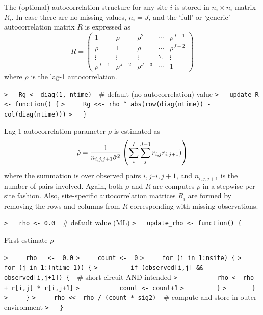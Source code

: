 \documentclass[a4paper]{article}
\begin{document}
The (optional) autocorrelation structure for any site $i$ is stored in $n_i\times n_i$ matrix $R_i$.
In case there are no missing values, $n_i=J$, and the `full' or `generic' autocorrelation matrix $R$ is expressed
as
\begin{equation}
R = \begin{pmatrix}
  1          & \rho       & \rho^2     & \cdots & \rho^{J-1} \\
  \rho       & 1          & \rho       & \cdots & \rho^{J-2} \\
  \vdots     & \vdots     & \vdots     & \ddots & \vdots     \\
  \rho^{J-1} & \rho^{J-2} & \rho^{J-3} & \cdots & 1
  \end{pmatrix}
\end{equation}
where $\rho$ is the lag-1 autocorrelation.\par
\verb~>   Rg <- diag(1, ntime)  ~{\sffamily\# default (no autocorrelation) value}\newline
\verb~>   update_R <- function() {~\newline
\verb~>     Rg <<- rho ^ abs(row(diag(ntime)) - col(diag(ntime)))~\newline
\verb~>   }~\par

Lag-1 autocorrelation parameter $\rho$ is estimated as
\begin{equation}
  \hat{\rho} = \frac{1}{n_{i,j,j+1}\hat{\sigma}^2} \left(\sum_i^I\sum_j^{J-1} r_{i,j}r_{i,j+1}) \right)
\end{equation}
where the summation is over observed pairs $i,j$--$i,j+1$, and $n_{i,j,j+1}$ is the number of pairs involved.
Again, both $\rho$ and $R$ are computes $\rho$ in a stepwise per-site fashion.
Also, site-specific autocorrelation matrices $R_i$ are formed by removing the rows and columns from $R$
corresponding with missing observations.\par
\verb~>   rho <- 0.0  ~{\sffamily\# default value (ML)}\newline
\verb~>   update_rho <- function() {~\par
First estimate $\rho$\par
\verb~>     rho   <-  0.0~\newline
\verb~>     count <-  0~\newline
\verb~>     for (i in 1:nsite) {~\newline
\verb~>       for (j in 1:(ntime-1)) {~\newline
\verb~>         if (observed[i,j] && observed[i,j+1]) {  ~{\sffamily\# short-circuit AND intended}\newline
\verb~>           rho <- rho + r[i,j] * r[i,j+1]~\newline
\verb~>           count <- count+1~\newline
\verb~>         }~\newline
\verb~>       }~\newline
\verb~>     }~\newline
\verb~>     rho <<- rho / (count * sig2)  ~{\sffamily\# compute and store in outer environment}\newline
\verb~>   }~\par
\end{document}

